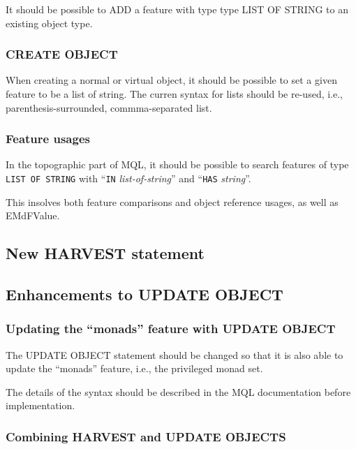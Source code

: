 \documentclass[a4paper,12pt]{article}
\begin{document}
It should be possible to ADD a feature with type type LIST OF STRING
to an existing object type.

\subsubsection{CREATE OBJECT}

When creating a normal or virtual object, it should be possible to set
a given feature to be a list of string.  The curren syntax for lists
should be re-used, i.e., parenthesis-surrounded, commma-separated
list.

\subsubsection{Feature usages}

In the topographic part of MQL, it should be possible to search
features of type \texttt{LIST OF STRING} with ``\texttt{IN}
\textit{list-of-string}'' and ``\texttt{HAS} \textit{string}''.

This insolves both feature comparisons and object reference usages, as
well as EMdFValue.

\subsection{New HARVEST statement}

\subsection{Enhancements to UPDATE OBJECT}

\subsubsection{Updating the ``monads'' feature with UPDATE OBJECT}

The UPDATE OBJECT statement should be changed so that it is also able
to update the ``monads'' feature, i.e., the privileged monad set.

The details of the syntax should be described in the MQL documentation
before implementation.

\subsubsection{Combining HARVEST and UPDATE OBJECTS}
\end{document}
